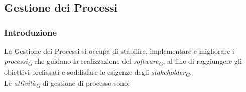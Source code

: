 \subsection{Gestione dei Processi}

\subsubsection{Introduzione}
La Gestione dei Processi si occupa di stabilire, implementare e migliorare i \textit{processi}\textsubscript{\textit{G}} che guidano la realizzazione del \textit{software}\textsubscript{\textit{G}}, al fine di raggiungere gli obiettivi prefissati e soddisfare le esigenze degli \textit{stakeholder}\textsubscript{\textit{G}}.
\\
Le \textit{attività}\textsubscript{\textit{G}} di gestione di processo sono:
